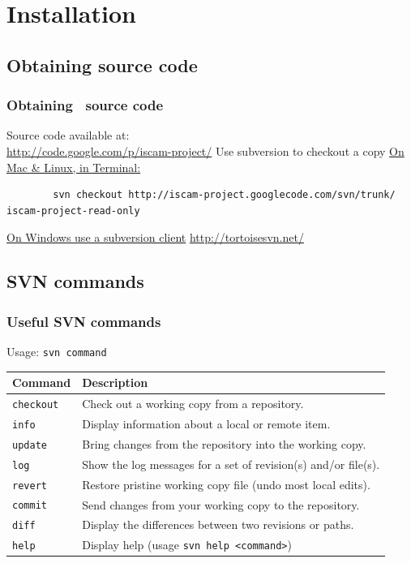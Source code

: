\section{Installation} %
\label{sec:installation}


\subsection[Source code]{Obtaining source code} %
\label{sub:obtaining_source_code}

\begin{frame}[containsverbatim]
	\frametitle{Obtaining \iscam\ source code}
	Source code available at:\\
	\url{http://code.google.com/p/iscam-project/}
	\vfill
	Use subversion to checkout a copy
	\vfill
	\underline{On Mac \& Linux, in Terminal:}
	\tiny
	\begin{verbatim}
		svn checkout http://iscam-project.googlecode.com/svn/trunk/			iscam-project-read-only
	\end{verbatim}
	\normalsize
	\vfill
	\underline{On Windows use a subversion client}
	\url{http://tortoisesvn.net/}
\end{frame}

\subsection{SVN commands} %
\label{sub:svn_commands}
\begin{frame}
	\frametitle{Useful SVN commands}
	Usage: \texttt{svn command}
	\vfill
	\begin{scriptsize}
	\begin{tabular}{ll}
		Command & Description\\
		\hline
		\texttt{checkout} & Check out a working copy from a repository.\\
		\texttt{info}     & Display information about a local or remote item.\\
		\texttt{update}   & Bring changes from the repository into the working copy.\\
		\texttt{log}      & Show the log messages for a set of revision(s) and/or file(s).\\
		\texttt{revert}   & Restore pristine working copy file (undo most local edits).\\
		\texttt{commit}   & Send changes from your working copy to the repository.\\
		\texttt{diff}     & Display the differences between two revisions or paths.\\
		\texttt{help}     & Display help (usage \texttt{svn help <command>})\\
		\hline
	\end{tabular}
	\end{scriptsize}
\end{frame}

